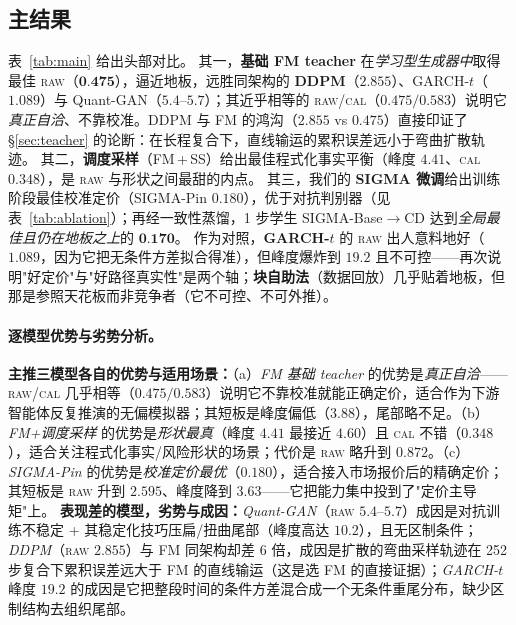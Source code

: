 \documentclass[11pt]{ctexart}
\newcommand{\raw}{\textsc{raw}}
\renewcommand{\cal}{\textsc{cal}}
\newcommand{\best}[1]{\textbf{#1}}
\begin{document}
\subsection{主结果}
表~\ref{tab:main} 给出头部对比。
其一，\textbf{基础 FM teacher} 在\emph{学习型生成器中}取得最佳 \raw{}（$\best{0.475}$），逼近地板，远胜同架构的 \textbf{DDPM}（$2.855$）、GARCH-$t$（$1.089$）与 Quant-GAN（$5.4$–$5.7$）；其近乎相等的 \raw{}/\cal{}（$0.475/0.583$）说明它\emph{真正自洽}、不靠校准。DDPM 与 FM 的鸿沟（$2.855$ vs $0.475$）直接印证了 \S\ref{sec:teacher} 的论断：在长程复合下，直线输运的累积误差远小于弯曲扩散轨迹。
其二，\textbf{调度采样}（FM\,+\,SS）给出最佳程式化事实平衡（峰度 $4.41$、\cal{} $0.348$），是 \raw{} 与形状之间最甜的内点。
其三，我们的 \textbf{SIGMA 微调}给出训练阶段最佳校准定价（SIGMA-Pin $0.180$），优于对抗判别器（见表~\ref{tab:ablation}）；再经一致性蒸馏，1 步学生 SIGMA-Base$\to$CD 达到\emph{全局最佳且仍在地板之上}的 $\best{0.170}$。
作为对照，\textbf{GARCH-$t$} 的 \raw{} 出人意料地好（$1.089$，因为它把无条件方差拟合得准），但峰度爆炸到 $19.2$ 且不可控——再次说明"好定价"与"好路径真实性"是两个轴；\textbf{块自助法}（数据回放）几乎贴着地板，但那是参照天花板而非竞争者（它不可控、不可外推）。

\paragraph{逐模型优势与劣势分析。}
\textbf{主推三模型各自的优势与适用场景：}（a）\emph{FM 基础 teacher} 的优势是\emph{真正自洽}——\raw{}/\cal{} 几乎相等（$0.475/0.583$）说明它不靠校准就能正确定价，适合作为下游智能体反复推演的无偏模拟器；其短板是峰度偏低（$3.88$），尾部略不足。（b）\emph{FM+调度采样} 的优势是\emph{形状最真}（峰度 $4.41$ 最接近 $4.60$）且 \cal{} 不错（$0.348$），适合关注程式化事实/风险形状的场景；代价是 \raw{} 略升到 $0.872$。（c）\emph{SIGMA-Pin} 的优势是\emph{校准定价最优}（$0.180$），适合接入市场报价后的精确定价；其短板是 \raw{} 升到 $2.595$、峰度降到 $3.63$——它把能力集中投到了"定价主导矩"上。
\textbf{表现差的模型，劣势与成因：}\emph{Quant-GAN}（\raw{} $5.4$–$5.7$）成因是对抗训练不稳定 + 其稳定化技巧压扁/扭曲尾部（峰度高达 $10.2$），且无区制条件；\emph{DDPM}（\raw{} $2.855$）与 FM 同架构却差 $6$ 倍，成因是扩散的弯曲采样轨迹在 252 步复合下累积误差远大于 FM 的直线输运（这是选 FM 的直接证据）；\emph{GARCH-$t$} 峰度 $19.2$ 的成因是它把整段时间的条件方差混合成一个无条件重尾分布，缺少区制结构去组织尾部。
\end{document}
